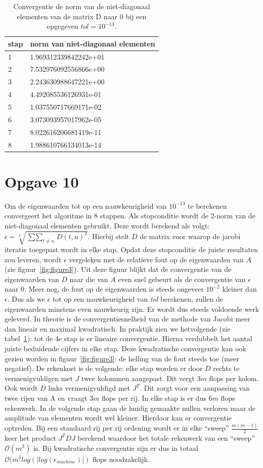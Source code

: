 \documentclass[a4paper]{article}
\newcommand{\opgave}[1]{\section*{Opgave #1}}
\begin{document}
\begin{table}[h]
\begin{tabular}{|l|l|}
\hline
stap & norm van niet-diagonaal elementen\\
\hline
1 & 1.969312339842242e+01\\
2 & 7.532976092556866e+00\\
3 & 2.243630988647221e+00\\
4 & 4.492085536126931e-01\\
5 & 1.037550717669171e-02\\
6 & 3.073093957017962e-05\\
7 & 8.022616206681419e-11\\
8 & 1.988610766134013e-14\\
\hline
\end{tabular}
\caption{Convergentie de norm van de niet-diagonaal elementen van de matrix D naar 0 bij een opgegeven $tol =10^{-13}$.}
\label{table:tab2}
\end{table}
\opgave{10}
Om de eigenwaarden tot op een nauwkeurigheid van $10^{-13}$ te berekenen convergeert het algoritme in 8 stappen. Als stopconditie wordt de 2-norm van de niet-diagonaal elementen gebruikt. Deze wordt berekend als volgt: $\epsilon = \sqrt[2]{\mathop{\sum\sum}_{t\neq u} D(t,u)^2}$. Hierbij stelt $D$ de matrix voor waarop de jacobi iteratie toegepast wordt in elke stap. Opdat deze stopconditie de juiste resultaten zou leveren, wordt $\epsilon$ vergeleken met de relatieve fout op de eigenwaarden van $A$ (zie figuur~\ref{fig:figure3}). Uit deze figuur blijkt dat de convergentie van de eigenwaarden van $D$ naar die van $A$ even snel gebeurt als de convergentie van $\epsilon$ naar 0. Meer nog, de fout op de eigenwaarden is steeds ongeveer $10^{-2}$ kleiner dan $\epsilon$. Dus als we $\epsilon$ tot op een nauwkeurigheid van \textit{tol} berekenen, zullen de eigenwaarden minstens even nauwkeurig zijn. Er wordt dus steeds voldoende werk geleverd. 
In theorie is de convergentiesnelheid van de methode van Jacobi meer dan lineair en maximal kwadratisch. In praktijk zien we hetvolgende (zie tabel~\ref{table:tab2}): tot de 4e stap is er lineaire convergentie. Hierna verdubbelt het aantal juiste beduidende cijfers in elke stap. Deze kwadratische convergentie kan ook gezien worden in figuur~\ref{fig:figure3}: de helling van de fout steeds toe (meer negatief).
De rekenkost is de volgende: elke stap worden er door $D$ rechts te vermenigvuldigen met $J$ twee kolommen aangepast. Dit vergt $3m$   flops per kolom. Ook wordt $D$ links vermenigvuldigd met $J^{T}$.  Dit zorgt voor een aanpassing van twee rijen van A en vraagt $3m$ flops per rij. In elke stap is er dus $6m$ flops rekenwerk. In de volgende stap gaan de huidig gemaakte nullen verloren maar de amplitude van elementen wordt wel kleiner. Hierdoor kan er convergentie optreden. Bij een standaard rij per rij ordening wordt er in elke “sweep” $\frac{m(m-1)}{2}$ keer het product $J^{T}D J$ berekend waardoor het totale rekenwerk van een “sweep” $\mathcal{O}(m^{3})$ is. Bij kwadratische convergentie zijn er dus in totaal $\mathcal{O}(m^{3}log(|log(\epsilon_{machine})|)$ flops noodzakelijk.


\end{document}
